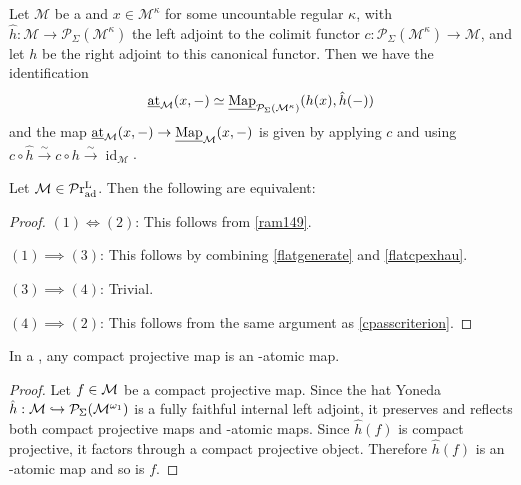 \documentclass[a4paper,10pt, oneside]{amsart}
\begin{document}
\fi
\begin{prop}
	Let $\mathcal{M}$ be a \dualaddinfcat and $x \in \mathcal{M}^\kappa$ for some uncountable regular $\kappa$, with $\hat{h}: \mathcal{M} \rightarrow \mathcal{P}_{\Sigma}\left(\mathcal{M}^\kappa\right)$ the left adjoint to the colimit functor $c: \mathcal{P}_{\Sigma}\left(\mathcal{M}^\kappa\right) \rightarrow \mathcal{M}$, and let $h$ be the right adjoint to this canonical functor. Then we have the identification
	$$
	\underline{\operatorname{at}}_{\mathcal{M}}(x,-) \simeq \underline{\operatorname{Map}}_{\mathcal{P}_{\Sigma}\left(\mathcal{M}^\kappa\right)}(h(x), \hat{h}(-))
	$$
	and the map $\underline{\operatorname{at}}_{\mathcal{M}}(x,-)  \rightarrow \underline{\operatorname{Map}}_{\mathcal{M}}(x,-)$ is given by applying $c$ and using $c \circ \hat{h} \xrightarrow{\sim} c \circ h \xrightarrow{\sim} \operatorname{id}_{\mathcal{M}}$.
\end{prop}
\begin{prop}\label{dualaddcprojmaps}
	Let $\mathcal{M}\in\mathcal{P}\mathrm{r}_{\mathrm{ad}}^\mathrm{L}$. Then the following are equivalent:
\end{prop}
\begin{proof}
	$(1)\Longleftrightarrow  (2)$: This follows from \cref{ram149}.
	
	$(1)\implies (3)$: This follows by combining \cref{flatgenerate} and \cref{flatcpexhau}.
	
	$(3)\implies (4)$: Trivial.
	
	$(4)\implies (2)$: This follows from the same argument as \cref{cpasscriterion}.
\end{proof}
\begin{lem}\label{a25}
	In a \dualaddinfcat \mcm, any compact projective map is an \spgeq-atomic map.
\end{lem}
\begin{proof}
Let $f\in\mathcal{M}$ be a compact projective map.	Since the hat Yoneda $\hat{h}:\mathcal{M}\hookrightarrow \mathcal{P}_{\Sigma}(\mathcal{M}^{\omega_1})$ is a fully faithful internal left adjoint, it preserves and reflects both compact projective maps and \spgeq-atomic maps. Since $\hat{h}(f)$ is compact projective, it factors through a compact projective object. Therefore $\hat{h}(f)$ is an \spgeq-atomic map and so is $f$.
\end{proof}
\end{document}
